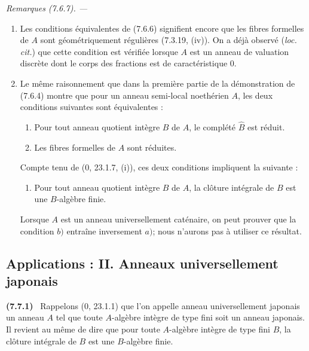 \documentclass[10pt,oneside]{book}
\newenvironment{env}[1][]{\par\medskip\noindent\textbf{(#1)}\ }{\par}
\newenvironment{remarks}[1][]{%
  \par\medskip\noindent\itshape Remarques (#1). ---\ }{\par}
\begin{document}
\begin{remarks}[7.6.7]
\label{IV.2.s7.6.7-fr}
\begin{enumerate}
\item[\emph{(i)}] Les conditions équivalentes de (7.6.6) signifient encore que
les fibres formelles de $A$ sont géométriquement régulières (7.3.19, (iv)). On
a déjà observé (\emph{loc. cit.}) que cette condition est vérifiée lorsque $A$
est un anneau de valuation discrète dont le corps des fractions est de
caractéristique 0.

\item[\emph{(ii)}] Le même raisonnement que dans la première partie de la
démonstration de (7.6.4) montre que pour un anneau semi-local noethérien $A$,
les deux conditions suivantes sont équivalentes :
\begin{enumerate}
\item[\emph{a)}] Pour tout anneau quotient intègre $B$ de $A$, le complété
$\widehat B$ est réduit.
\item[\emph{a$'$)}] Les fibres formelles de $A$ sont réduites.
\end{enumerate}
Compte tenu de (0, 23.1.7, (i)), ces deux conditions impliquent la suivante :
\begin{enumerate}
\item[\emph{b)}] Pour tout anneau quotient intègre $B$ de $A$, la clôture
intégrale de $B$ est une $B$-algèbre finie.
\end{enumerate}
Lorsque $A$ est un anneau universellement caténaire, on peut prouver que la
condition $b)$ entraîne inversement $a)$; nous n'aurons pas à utiliser ce
résultat.
\end{enumerate}
\end{remarks}

\subsection{Applications : II. Anneaux universellement japonais}
\label{IV.2.ss7.7-fr}

\begin{env}[7.7.1]
\label{IV.2.s7.7.1-fr}
Rappelons (0, 23.1.1) que l'on appelle anneau universellement japonais un
anneau $A$ tel que toute $A$-algèbre intègre de type fini soit un anneau
japonais. Il revient au même de dire que pour toute $A$-algèbre intègre de type
fini $B$, la clôture intégrale de $B$ est une $B$-algèbre finie.
\end{env}
\end{document}
